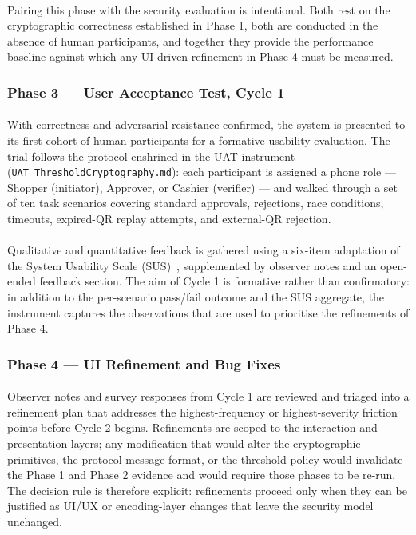 \documentclass[a4paper]{scl-article}
\begin{document}
\paragraph{}Pairing this phase with the security evaluation is intentional. Both rest on the cryptographic correctness established in Phase 1, both are conducted in the absence of human participants, and together they provide the performance baseline against which any UI-driven refinement in Phase 4 must be measured.

\subsubsection{Phase 3 --- User Acceptance Test, Cycle 1}
\label{sect:meth4_uat1}
\paragraph{}With correctness and adversarial resistance confirmed, the system is presented to its first cohort of human participants for a formative usability evaluation. The trial follows the protocol enshrined in the UAT instrument (\texttt{UAT\_ThresholdCryptography.md}): each participant is assigned a phone role --- Shopper (initiator), Approver, or Cashier (verifier) --- and walked through a set of ten task scenarios covering standard approvals, rejections, race conditions, timeouts, expired-QR replay attempts, and external-QR rejection.

\paragraph{}Qualitative and quantitative feedback is gathered using a six-item adaptation of the System Usability Scale (SUS)~\cite{brooke1996sus, bangor2008sus}, supplemented by observer notes and an open-ended feedback section. The aim of Cycle 1 is formative rather than confirmatory: in addition to the per-scenario pass/fail outcome and the SUS aggregate, the instrument captures the observations that are used to prioritise the refinements of Phase 4.

\subsubsection{Phase 4 --- UI Refinement and Bug Fixes}
\label{sect:meth4_refine}
\paragraph{}Observer notes and survey responses from Cycle 1 are reviewed and triaged into a refinement plan that addresses the highest-frequency or highest-severity friction points before Cycle 2 begins. Refinements are scoped to the interaction and presentation layers; any modification that would alter the cryptographic primitives, the protocol message format, or the threshold policy would invalidate the Phase 1 and Phase 2 evidence and would require those phases to be re-run. The decision rule is therefore explicit: refinements proceed only when they can be justified as UI/UX or encoding-layer changes that leave the security model unchanged.
\end{document}
